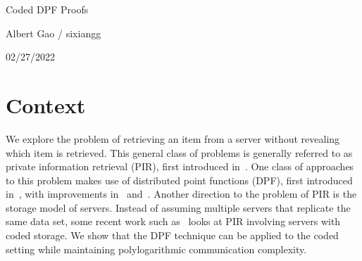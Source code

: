 \documentclass[11pt]{article}
\newcommand{\myinfo}{Albert Gao / sixiangg}
\newcommand{\currdate}{02/27/2022}
\begin{document}
\bigskip                        %

\thispagestyle{plain}
\begin{center}                  %
{\Huge Coded DPF Proofs}

\vspace{0.3cm}

\large{\myinfo}

\large{\currdate}

\end{center}

\section{Context}
We explore the problem of retrieving an item from a server without revealing which item is retrieved. This general class of problems is generally referred to as private information retrieval (PIR), first introduced in~\cite{chor95}. One class of approaches to this problem makes use of distributed point functions (DPF), first introduced in~\cite{gi14}, with improvements in~\cite{bgi15} and~\cite{bgi18}. Another direction to the problem of PIR is the storage model of servers. Instead of assuming multiple servers that replicate the same data set, some recent work such as~\cite{tajeddine19} looks at PIR involving servers with coded storage. We show that the DPF technique can be applied to the coded setting while maintaining polylogarithmic communication complexity.
\end{document}
